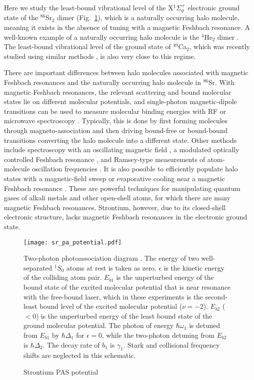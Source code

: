 Here we study the least-bound vibrational level of the X$^1\Sigma_g^+$ electronic ground state of the $^{86}$Sr$_2$ dimer (Fig.\ \ref{PASDiagram}), which is a naturally occurring halo molecule, meaning it exists in the absence of tuning with a magnetic Feshbach resonance. A well-known example of a naturally occurring halo molecule is the $^4$He$_2$ dimer \cite{lmk93,sto94,kgj06}. The least-bound vibrational level of the ground state of $^{40}$Ca$_2$, which was recently studied using similar methods \cite{pdt17}, is also very close to this regime.



There are important differences between halo molecules associated with magnetic Feshbach resonances and the naturally occurring halo molecule in $^{86}$Sr. With magnetic Feshbach resonances, the relevant scattering and bound molecular states lie on different molecular potentials, and single-photon magnetic-dipole transitions can be used to measure molecular binding energies with RF or microwave spectroscopy \cite{cgj10,cju05,thw05b}. Typically, this is done by first forming molecules through magneto-association and then driving bound-free or bound-bound transitions converting the halo molecule into a different state. Other methods include spectroscopy with an oscillating magnetic field \cite{thw05b}, a modulated optically controlled Feshbach resonance \cite{chx15}, and Ramsey-type measurements of atom-molecule oscillation frequencies \cite{ckt03}. It is also possible to efficiently populate halo states with a magnetic-field sweep \cite{grj03} or evaporative cooling \cite{jba03} near a magnetic Feshbach resonance \cite{cgj10}. These are powerful techniques for manipulating quantum gases of alkali metals and other open-shell atoms, for which there are many magnetic Feshbach resonances. Strontium, however, due to its closed-shell electronic structure, lacks magnetic Feshbach resonances in the electronic ground state.


\begin{figure} \label{PASDiagram}
\centerline{
  \texttt{[image: sr\_pa\_potential.pdf]}}
  \caption{Strontium PAS potential}{Two-photon photoassociation diagram . The energy of two well-separated $^1S_0$ atoms at rest is taken as zero. $\epsilon$ is the kinetic energy of the colliding atom pair. $E_{b1}$ is the unperturbed energy of the bound state of the excited molecular potential that is near resonance with the free-bound laser, which in these experiments is the second-least bound level of the excited molecular potential ($\nu=-2$). $E_{b2}$ ($<0$) is the unperturbed energy of the least bound state of the ground molecular potential. The photon of energy $\hbar \omega_1$ is detuned from $E_{b1}$ by $\hbar \Delta_1$ for $\epsilon=0$, while the two-photon detuning from $E_{b2}$ is $\hbar \Delta_2$. The decay rate of $b_1$ is $\gamma_1$. Stark and collisional frequency shifts are neglected in this schematic.}
  
\end{figure}

